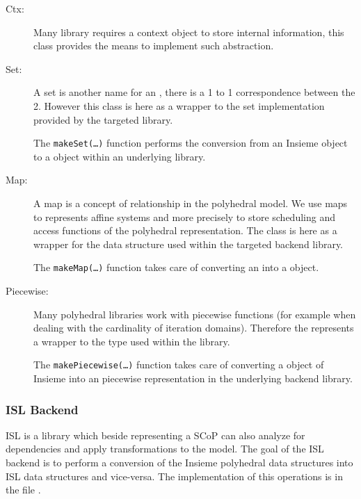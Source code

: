 \begin{description}
\item[Ctx:] Many library requires a context object to store internal
	information, this class provides the means to implement such abstraction. 

\item[Set:] A set is another name for an , there is a 1 to
	1 correspondence between the 2. However this class is here as a wrapper to
	the set implementation provided by the targeted library. 

	The {\tt makeSet(\ldots)} function performs the conversion from an Insieme
	 object to a  object within an underlying
	library. 

\item[Map:] A map is a concept of relationship in the polyhedral model. We use
	maps to represents affine systems and more precisely to store scheduling and
	access functions of the polyhedral representation. The class  is
	here as a wrapper for the data structure used within the targeted backend
	library. 

	The {\tt makeMap(\ldots)} function takes care of converting an
	 into a  object. 

\item[Piecewise:] Many polyhedral libraries work with piecewise functions (for
	example when dealing with the cardinality of iteration domains). Therefore
	the  represents a wrapper to the type used within the
	library. 

	The {\tt makePiecewise(\ldots)} function takes care of converting a
	 object of Insieme into an piecewise representation in the
	underlying backend library. 


\end{description}


\subsubsection{ISL Backend}

ISL is a library which beside representing a SCoP can also analyze for
dependencies and apply transformations to the model. The goal of the ISL backend
is to perform a conversion of the Insieme polyhedral data structures into ISL
data structures and vice-versa. The implementation of this operations is in the
file .

